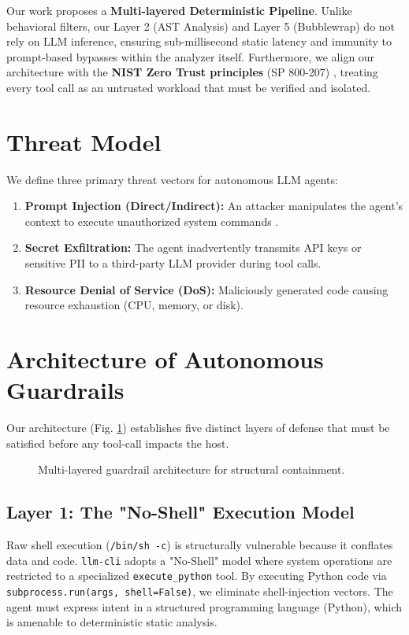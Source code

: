\documentclass[conference]{IEEEtran}
\begin{document}
Our work proposes a \textbf{Multi-layered Deterministic Pipeline}. Unlike behavioral filters, our Layer 2 (AST Analysis) and Layer 5 (Bubblewrap) do not rely on LLM inference, ensuring sub-millisecond static latency and immunity to prompt-based bypasses within the analyzer itself. Furthermore, we align our architecture with the \textbf{NIST Zero Trust principles} (SP 800-207) \cite{nist2020zt}, treating every tool call as an untrusted workload that must be verified and isolated.

\section{Threat Model}
We define three primary threat vectors for autonomous LLM agents:
\begin{enumerate}
    \item \textbf{Prompt Injection (Direct/Indirect):} An attacker manipulates the agent's context to execute unauthorized system commands \cite{perez2022ignore}.
    \item \textbf{Secret Exfiltration:} The agent inadvertently transmits API keys or sensitive PII to a third-party LLM provider during tool calls.
    \item \textbf{Resource Denial of Service (DoS):} Maliciously generated code causing resource exhaustion (CPU, memory, or disk).
\end{enumerate}

\section{Architecture of Autonomous Guardrails}
Our architecture (Fig. \ref{fig:guardrail_arch}) establishes five distinct layers of defense that must be satisfied before any tool-call impacts the host.

\begin{figure}[htbp]
\centering
\resizebox{\columnwidth}{!}{
    
}
\caption{Multi-layered guardrail architecture for structural containment.}
\label{fig:guardrail_arch}
\end{figure}

\subsection{Layer 1: The "No-Shell" Execution Model}
Raw shell execution (\texttt{/bin/sh -c}) is structurally vulnerable because it conflates data and code. \texttt{llm-cli} adopts a "No-Shell" model where system operations are restricted to a specialized \texttt{execute\_python} tool. By executing Python code via \texttt{subprocess.run(args, shell=False)}, we eliminate shell-injection vectors. The agent must express intent in a structured programming language (Python), which is amenable to deterministic static analysis.
\end{document}
